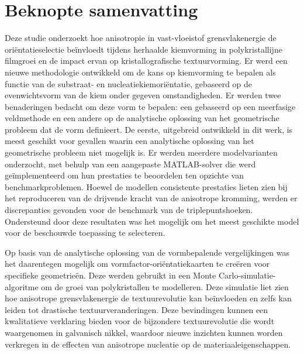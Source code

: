 \chapter{Beknopte samenvatting}
Deze studie onderzoekt hoe anisotropie in vast-vloeistof grensvlakenergie de oriëntatieselectie beïnvloedt tijdens herhaalde kiemvorming in polykristallijne filmgroei en de impact ervan op kristallografische textuurvorming. Er werd een nieuwe methodologie ontwikkeld om de kans op kiemvorming te bepalen als functie van de substraat- en nucleatiekiemoriëntatie, gebaseerd op de evenwichtsvorm van de kiem onder gegeven omstandigheden. Er werden twee benaderingen bedacht om deze vorm te bepalen: een gebaseerd op een meerfasige veldmethode en een andere op de analytische oplossing van het geometrische probleem dat de vorm definieert. De eerste, uitgebreid ontwikkeld in dit werk, is meest geschikt voor gevallen waarin een analytische oplossing van het geometrische probleem niet mogelijk is. Er werden meerdere modelvarianten onderzocht, met behulp van een aangepaste MATLAB-solver die werd geïmplementeerd om hun prestaties te beoordelen ten opzichte van benchmarkproblemen. Hoewel de modellen consistente prestaties lieten zien bij het reproduceren van de drijvende kracht van de anisotrope kromming, werden er discrepanties gevonden voor de benchmark van de triplepuntshoeken. Ondersteund door deze resultaten was het mogelijk om het meest geschikte model voor de beschouwde toepassing te selecteren. 

Op basis van de analytische oplossing van de vormbepalende vergelijkingen was het daarentegen mogelijk om vormfactor-oriëntatiekaarten te creëren voor specifieke geometrieën. Deze werden gebruikt in een Monte Carlo-simulatie-algoritme om de groei van polykristallen te modelleren. Deze simulatie liet zien hoe anisotrope grensvlakenergie de textuurevolutie kan beïnvloeden en zelfs kan leiden tot drastische textuurveranderingen. Deze bevindingen kunnen een kwalitatieve verklaring bieden voor de bijzondere textuurevolutie die wordt waargenomen in galvanisch nikkel, waardoor nieuwe inzichten kunnen worden verkregen in de effecten van anisotrope nucleatie op de materiaaleigenschappen.


\cleardoublepage

